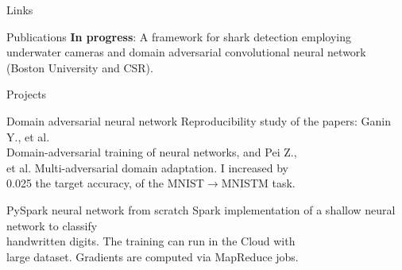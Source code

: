\documentclass{resume}
\begin{document}
\begin{multicols}{2}
	\columnbreak
	
	\begin{rSection}{\Large Links}
	\end{rSection}
	
	\begin{rSection}{\Large Publications}
		\textbf{In progress}:  A framework for shark detection employing underwater cameras and domain adversarial convolutional neural network (Boston University and CSR). 
	\end{rSection}

	\begin{rSection}{\Large Projects}
	
		\begin{project}{Domain adversarial neural network}{}{}{
			Reproducibility study of the papers: Ganin Y., et al. \\Domain-adversarial training of neural networks, and Pei Z.,\\ et al. Multi-adversarial domain adaptation.
			I increased by \\0.025 the target accuracy, of the MNIST$\rightarrow$MNISTM task.
		}
		\end{project}
	
		\begin{project}{PySpark neural network from scratch}{}{}{
		 	Spark implementation of a shallow neural network to classify \\handwritten digits. The training can run in the Cloud with \\large dataset. Gradients are computed via MapReduce jobs.
		}
		\end{project}
		

\end{rSection}
\end{multicols}
\end{document}
